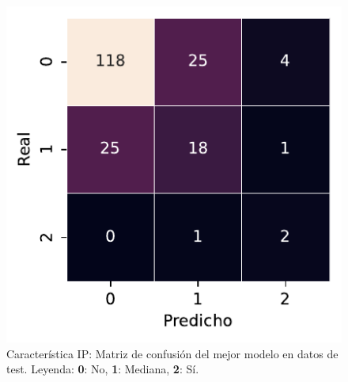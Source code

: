 \begin{figure}[htbp]
    \vspace{1.5em} %

    \includegraphics[width=0.6\linewidth]{figures/5_experiments/single-ip-cm.pdf}
    \caption[Característica IP: Matriz de confusión del mejor modelo en datos de test.]{Característica IP: Matriz de confusión del mejor modelo en datos de test. Leyenda: \textbf{0}: No, \textbf{1}: Mediana, \textbf{2}: Sí.}
    \label{fig5:IP_confusion_matrix}
\end{figure}

